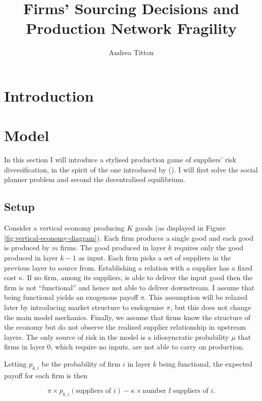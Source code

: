 \documentclass[american, abstract=on]{scrartcl}
\author{Andrea Titton}
\title{Firms' Sourcing Decisions and\\ Production Network Fragility}
\theoremstyle{plain}
\newcommand{\citein}[1]{\citeauthor{#1} (\citeyear{#1})}
\begin{document}
\maketitle
\section{Introduction}

\section{Model}

In this section I will introduce a stylised production game of suppliers' risk diversification, in the spirit of the one introduced by \citein{elliott_supply_2022}. I will first solve the social planner problem and second the decentralised equilibrium.

\subsection{Setup}

Consider a vertical economy producing $K$ goods (as displayed in Figure \ref{fig:vertical-economy-diagram}). Each firm produces a single good and each good is produced by $m$ firms. The good produced in layer $k$ requires only the good produced in layer $k - 1$ as input. Each firm picks a set of suppliers in the previous layer to source from. Establishing a relation with a supplier has a fixed cost $\kappa$. If no firm, among its suppliers, is able to deliver the input good then the firm is not ``functional'' and hence not able to deliver downstream. I assume that being functional yields an exogenous payoff $\pi$. This assumption will be relaxed later by introducing market structure to endogenise $\pi$, but this does not change the main model mechanics. Finally, we assume that firms know the structure of the economy but do not observe the realised supplier relationship in upstream layers. The only source of risk in the model is a idiosyncratic probability $\mu$ that firms in layer $0$, which require no inputs, are not able to carry on production.

Letting $p_{k, i}$ be the probability of firm $i$ in layer $k$ being functional, the expected payoff for each firm is then

\begin{equation}
  \pi \times p_{k, i}(\text{suppliers of }i) - \kappa \times \text{number f suppliers of }i.
\end{equation}
\end{document}
